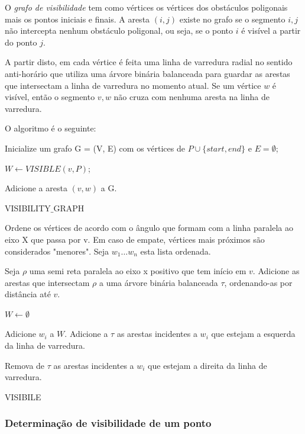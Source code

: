 \documentclass[11pt]{article} %
\begin{document}
O \emph{grafo de visibilidade} tem como vértices os vértices dos obstáculos poligonais mais os pontos iniciais e finais. A aresta $(i, j)$ existe no grafo se o segmento $i,j$ não intercepta nenhum obstáculo poligonal, ou seja, se o ponto $i$ é visível a partir do ponto $j$. 

A partir disto, em cada vértice é feita uma linha de varredura radial no sentido anti-horário que utiliza uma árvore binária balanceada para guardar as arestas que intersectam a linha de varredura no momento atual. Se um vértice $w$ é visível, então o segmento $v,w$ não cruza com nenhuma aresta na linha de varredura. 

O algoritmo é o seguinte:

\begin{algorithm}
Inicialize um grafo G = (V, E) com os vértices de $P\cup\{start,end\}$ e $E = \emptyset$;
 {
	$W \leftarrow VISIBLE(v, P)$;

	 {		
		Adicione a aresta $(v, w)$ a G.
	}
}
\caption{VISIBILITY$\_$GRAPH}
\end{algorithm}

\begin{algorithm}
Ordene os vértices de acordo com o ângulo que formam com a linha paralela ao eixo X que passa por v. Em caso de empate, vértices mais próximos são considerados "menores". Seja $w_1 \dots w_n$ esta lista ordenada.

Seja $\rho$ uma semi reta paralela ao eixo x positivo que tem início em $v$. Adicione as arestas que intersectam $\rho$ a uma árvore binária balanceada $\tau$, ordenando-as por distância até $v$.

$W \leftarrow \emptyset$

 {
	 {
		Adicione $w_i$ a $W$.
	}
	Adicione a $\tau$ as arestas incidentes a $w_i$ que estejam a esquerda da linha de varredura.

	Remova de $\tau$ as arestas incidentes a $w_i$ que estejam a direita da linha de varredura.
}
\caption{VISIBILE}
\end{algorithm}

\subsubsection{Determinação de visibilidade de um ponto}
\end{document}
